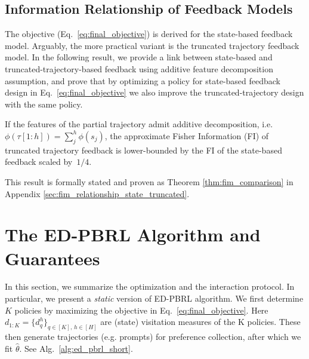 \documentclass{article}
\DeclareMathOperator*{\argmax}{arg\,max}
\begin{document}

\vspace{-0.2cm} \subsection{Information Relationship of Feedback Models}
\vspace{-0.2cm} The objective (Eq.\ \ref{eq:final_objective}) is derived for the state-based feedback model. Arguably, the more practical variant is the truncated trajectory feedback model. In the following result, we provide a link between state-based and truncated-trajectory-based feedback using additive feature decomposition assumption, and prove that by optimizing a policy for state-based feedback design in Eq.\ \ref{eq:final_objective} we also improve the truncated-trajectory design with the same policy.

\begin{theorem}
\label{thm:informal_fim_comparison}
If the features of the partial trajectory admit additive decomposition, i.e.\ $\phi(\tau[1{:}h]) = \sum_j^h \phi(s_j)$, the approximate Fisher Information (FI) of truncated trajectory feedback is lower-bounded by the FI of the state-based feedback scaled by~$1/4$. 
\end{theorem}
This result is formally stated and proven as Theorem \ref{thm:fim_comparison} in Appendix \ref{sec:fim_relationship_state_truncated}. 

\vspace{-0.2cm} \section{The ED-PBRL Algorithm and Guarantees}

\label{sec:alg_overview}\vspace{-0.2cm}
In this section, we summarize the optimization and the interaction protocol. In particular, we present a \emph{static} version of ED-PBRL algorithm. We first determine $K$ policies by maximizing the objective in Eq.~\ref{eq:final_objective}. Here $d_{1:K} = \{d_q^h\}_{q\in[K],\,h\in[H]}$ are (state) visitation measures of the K policies. These then generate trajectories (e.g. prompts) for preference collection, after which we fit $\hat{\theta}$. See Alg.~\ref{alg:ed_pbrl_short}.
\end{document}
